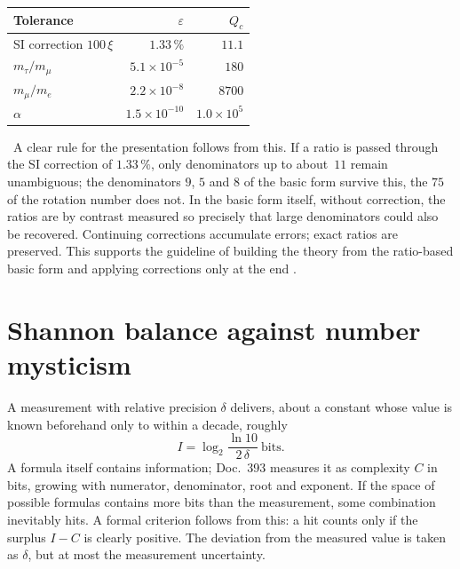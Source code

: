 \begin{center}
\begin{tabular}{@{}lrr@{}}
\toprule
\textbf{Tolerance} & \textbf{$\varepsilon$} & \textbf{$Q_c$}\\
\midrule
SI correction $100\,\xi$ & $1.33\,\%$ & $11.1$\\
$m_\tau/m_\mu$ & $5.1\times10^{-5}$ & $180$\\
$m_\mu/m_e$ & $2.2\times10^{-8}$ & $8700$\\
$\alpha$ & $1.5\times10^{-10}$ & $1.0\times10^{5}$\\
\bottomrule
\end{tabular}
\end{center}
\KM\ A clear rule for the presentation follows from this. If a ratio is passed through the SI
correction of $1.33\,\%$, only denominators up to about~$11$ remain unambiguous; the denominators $9$,
$5$ and $8$ of the basic form survive this, the $75$ of the rotation number does not. In the basic form
itself, without correction, the ratios are by contrast measured so precisely that large denominators
could also be recovered. Continuing corrections accumulate errors; exact ratios are preserved. This
supports the guideline of building the theory from the ratio-based basic form and applying corrections
only at the end \SM.

\section{Shannon balance against number mysticism}

A measurement with relative precision $\delta$ delivers, about a constant whose value is known
beforehand only to within a decade, roughly
\begin{equation}
  I=\log_2\frac{\ln 10}{2\,\delta}\ \text{bits}.
\end{equation}
A formula itself contains information; Doc.~393 measures it as complexity $C$ in bits, growing with
numerator, denominator, root and exponent. If the space of possible formulas contains more bits than the
measurement, some combination inevitably hits. A formal criterion follows from this: a hit counts only
if the surplus $I-C$ is clearly positive. The deviation from the measured value is taken as $\delta$,
but at most the measurement uncertainty.

